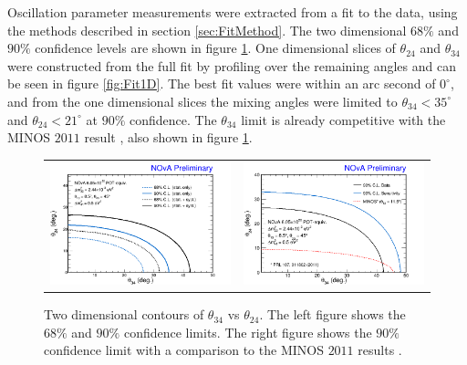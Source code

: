 Oscillation parameter measurements were extracted from a fit to the data, using the methods described in section \ref{sec:FitMethod}. The two dimensional $68\%$ and $90\%$ confidence levels are shown in figure \ref{fig:Fit2D}. One dimensional slices of $\theta_{24}$ and $\theta_{34}$ were constructed from the full fit by profiling over the remaining angles and can be seen in figure \ref{fig:Fit1D}. The best fit values were within an arc second of $0^\circ$, and from the one dimensional slices the mixing angles were limited to $\theta_{34} < 35^\circ$ and $\theta_{24} < 21^\circ$ at $90\%$ confidence. The $\theta_{34}$ limit is already competitive with the MINOS $2011$ result \cite{ref:MINOSSterile}, also shown in figure \ref{fig:Fit2D}.
\begin{figure}[htbp]
  \centering
  \begin{tabular}{c c}
    \includegraphics[width=.47\textwidth]{figures/Fits/2D3424.png} &
    \includegraphics[width=.47\textwidth]{figures/Fits/2D3424_MINOS.png} \\
  \end{tabular}
  \caption[Two Dimensional $\theta_{34}$ vs $\theta_{24}$ Contours]{Two dimensional contours of $\theta_{34}$ vs $\theta_{24}$. The left figure shows the $68\%$ and $90\%$ confidence limits. The right figure shows the $90\%$ confidence limit with a comparison to the MINOS $2011$ results \cite{ref:MINOSSterile}.}
  \label{fig:Fit2D}
\end{figure}

